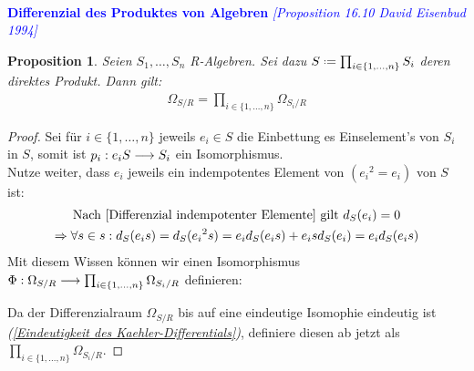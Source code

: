 \documentclass[10pt,a4paper]{report}
\newcommand{\ModulsOfDifferenzials}{David Eisenbud 1994}
\newcounter{Aussage}[chapter]
\newtheorem{prop}[Aussage]{Proposition}
\newcommand{\functionfront}[3]{\nolinebreak{#1:#2 \longrightarrow #3}}
\newcommand{\divR}[2]{\Omega_{#1/#2}}
\newcommand{\divf}[1]{d_{#1}}
\newcommand*{\defeq}{\mathrel{\vcenter{\baselineskip0.5ex \lineskiplimit0pt
                     \hbox{\scriptsize.}\hbox{\scriptsize.}}}%
                     =}
\begin{document}
\ \\
\textcolor{blue}{\textbf{Differenzial des Produktes von Algebren} \textit{[Proposition 16.10 \ModulsOfDifferenzials]}}
\begin{prop}\label{Differenzial des Produktes von Algebren}
Seien $S_1, \dots , S_n$ R-Algebren. Sei dazu $S \defeq \prod_{i \in \lbrace 1, \dots , n \rbrace} S_i$ deren direktes Produkt.
Dann gilt:
\begin{gather*}
\divR{S}{R} = \prod_{i \in \lbrace 1, \dots , n \rbrace} \divR{S_i}{R}
\end{gather*}
\end{prop}
\begin{proof}
Sei für $i \in \lbrace 1, \dots ,n \rbrace$ jeweils $e_i \in S$ die Einbettung es Einselement's von $S_i$ in $S$, somit ist $\functionfront{p_i}{e_iS}{S_i}$ ein Isomorphismus.\\
Nutze weiter, dass $e_i$ jeweils ein indempotentes Element von $({e_i}^2 = e_i)$ von $S$ ist:
\begin{gather*}
\text{Nach \cref{Differenzial indempotenter Elemente} gilt } \divf{S}(e_i) = 0 \\
\Rightarrow \forall s \in s : \divf{S}(e_is)= \divf{S}({e_i}^2s) = e_i\divf{S}(e_is) + e_is\divf{S}(e_i) = e_i\divf{S}(e_is) \\
\end{gather*}
Mit diesem Wissen können wir einen Isomorphismus $\functionfront{\Phi}{\divR{S}{R}}{\prod_{i \in \lbrace 1, \dots , n \rbrace} \divR{S_i}{R}}$ definieren:
\begin{center}
\end{center}
Da der Differenzialraum $\divR{S}{R}$ bis auf eine eindeutige Isomophie eindeutig ist \textit{(\cref{Eindeutigkeit des Kaehler-Differentials})}, definiere diesen ab jetzt als $\prod_{i \in \lbrace 1, \dots , n \rbrace} \divR{S_i}{R}$.
\end{proof}
\end{document}
